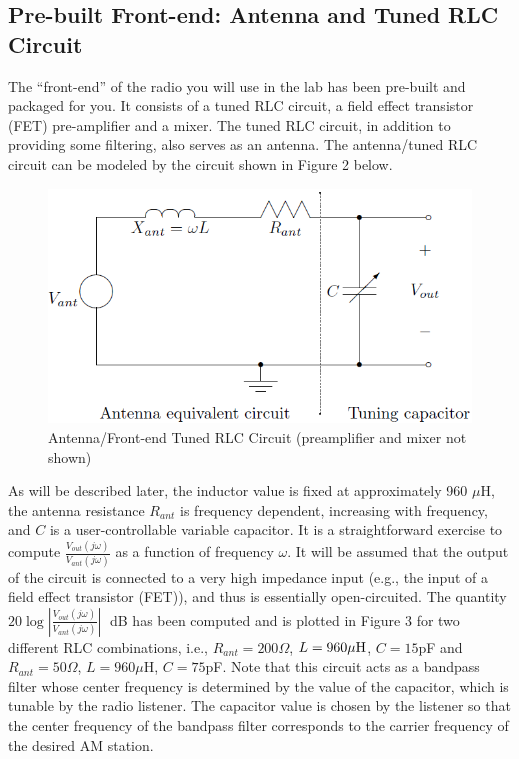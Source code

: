 \documentclass[a4paper]{article}
\begin{document}
\subsection{Pre-built Front-end: Antenna and Tuned RLC Circuit}
The “front-end” of the radio you will use in the lab has been pre-built and packaged for you. It consists of a tuned RLC circuit, a field effect transistor (FET) pre-amplifier and a mixer. The tuned RLC circuit, in addition to providing some filtering, also serves as an antenna. The antenna/tuned RLC circuit can be modeled by the circuit shown in Figure 2 below.
\begin{figure}[H]
	\centering
	\includegraphics[width=0.7\linewidth]{2.png}
	\caption{Antenna/Front-end Tuned RLC Circuit (preamplifier and mixer not shown)}
\end{figure}
As will be described later, the inductor value is fixed at approximately 960 $\mu$H, the antenna resistance $R_{ant}$ is frequency dependent, increasing with frequency, and $C$ is a user-controllable variable capacitor. It is a straightforward exercise to compute $\frac{V_{out}(j\omega)}{V_{ant}(j\omega)}$ as a function of frequency $\omega$. It will be assumed that the output of the circuit is connected to a very high impedance input (e.g., the input of a field effect transistor (FET)), and thus is essentially open-circuited. The quantity $20\log|\frac{V_{out}(j\omega)}{V_{ant}(j\omega)}|$ dB has been computed and is plotted in Figure 3 for two different RLC combinations, i.e., $R_{ant}=200\Omega$, $L=960\mu\rm{H}$, $C=15$pF and $R_{ant}=50\Omega$, $L=960\mu$H, $C=75$pF. Note that this circuit acts as a bandpass filter whose center frequency is determined by the value of the capacitor, which is tunable by the radio listener. The capacitor value is chosen by the listener so that the center frequency of the bandpass filter corresponds to the carrier frequency of the desired AM station.
\end{document}
